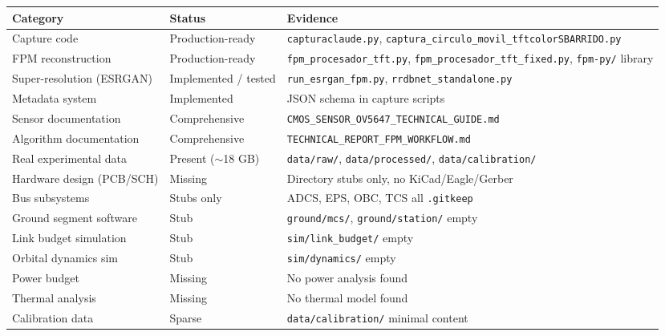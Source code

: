 \begin{longtable}{L{4cm} L{3cm} L{7cm}}
\toprule
\textbf{Category} & \textbf{Status} & \textbf{Evidence} \\
\midrule
Capture code & Production-ready & \texttt{capturaclaude.py}, \texttt{captura\_circulo\_movil\_tftcolorSBARRIDO.py} \\
FPM reconstruction & Production-ready & \texttt{fpm\_procesador\_tft.py}, \texttt{fpm\_procesador\_tft\_fixed.py}, \texttt{fpm-py/} library \\
Super-resolution (ESRGAN) & Implemented / tested & \texttt{run\_esrgan\_fpm.py}, \texttt{rrdbnet\_standalone.py} \\
Metadata system & Implemented & JSON schema in capture scripts \\
Sensor documentation & Comprehensive & \texttt{CMOS\_SENSOR\_OV5647\_TECHNICAL\_GUIDE.md} \\
Algorithm documentation & Comprehensive & \texttt{TECHNICAL\_REPORT\_FPM\_WORKFLOW.md} \\
Real experimental data & Present ($\sim$18 GB) & \texttt{data/raw/}, \texttt{data/processed/}, \texttt{data/calibration/} \\
Hardware design (PCB/SCH) & Missing & Directory stubs only, no KiCad/Eagle/Gerber \\
Bus subsystems & Stubs only & ADCS, EPS, OBC, TCS all \texttt{.gitkeep} \\
Ground segment software & Stub & \texttt{ground/mcs/}, \texttt{ground/station/} empty \\
Link budget simulation & Stub & \texttt{sim/link\_budget/} empty \\
Orbital dynamics sim & Stub & \texttt{sim/dynamics/} empty \\
Power budget & Missing & No power analysis found \\
Thermal analysis & Missing & No thermal model found \\
Calibration data & Sparse & \texttt{data/calibration/} minimal content \\
\bottomrule
\end{longtable}
